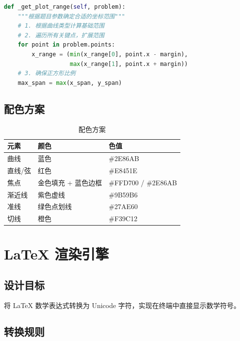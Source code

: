 \documentclass[11pt,a4paper]{article}
\begin{document}
\begin{lstlisting}[language=Python]
def _get_plot_range(self, problem):
    """根据题目参数确定合适的坐标范围"""
    # 1. 根据曲线类型计算基础范围
    # 2. 遍历所有关键点，扩展范围
    for point in problem.points:
        x_range = (min(x_range[0], point.x - margin),
                   max(x_range[1], point.x + margin))
    # 3. 确保正方形比例
    max_span = max(x_span, y_span)
\end{lstlisting}

\subsection{配色方案}

\begin{table}[h]
\centering
\begin{tabular}{lll}
\toprule
元素 & 颜色 & 色值 \\
\midrule
曲线 & 蓝色 & \#2E86AB \\
直线/弦 & 红色 & \#E8451E \\
焦点 & 金色填充 + 蓝色边框 & \#FFD700 / \#2E86AB \\
渐近线 & 紫色虚线 & \#9B59B6 \\
准线 & 绿色点划线 & \#27AE60 \\
切线 & 橙色 & \#F39C12 \\
\bottomrule
\end{tabular}
\caption{配色方案}
\end{table}

\section{LaTeX 渲染引擎}

\subsection{设计目标}

将 LaTeX 数学表达式转换为 Unicode 字符，实现在终端中直接显示数学符号。

\subsection{转换规则}
\end{document}
